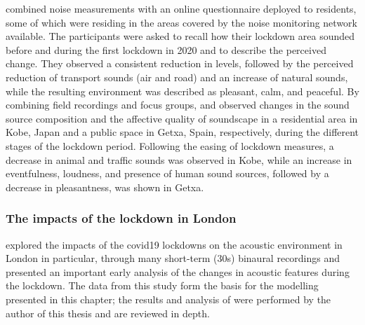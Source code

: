  \citet{Munoz2020Lockdown} combined noise measurements with an online questionnaire deployed to residents, some of which were residing in the areas covered by the noise monitoring network available. The participants were asked to recall how their lockdown area sounded before and during the first lockdown in 2020 and to describe the perceived change. They observed a consistent reduction in levels, followed by the perceived reduction of transport sounds (air and road) and an increase of natural sounds, while the resulting environment was described as pleasant, calm, and peaceful. By combining field recordings and focus groups, \citet{Sakagami2020How} and \citet{Lenzi2021Soundscape} observed changes in the sound source composition and the affective quality of soundscape in a residential area in Kobe, Japan and a public space in Getxa, Spain, respectively, during the different stages of the lockdown period. Following the easing of lockdown measures, a decrease in animal and traffic sounds was observed in Kobe, while an increase in eventfulness, loudness, and presence of human sound sources, followed by a decrease in pleasantness, was shown in Getxa.

 \subsubsection{The impacts of the lockdown in London}
 \citet{Aletta2020Assessing} explored the impacts of the \gls{covid19} lockdowns on the acoustic environment in London in particular, through many short-term (30s) binaural recordings and presented an important early analysis of the changes in acoustic features during the lockdown. The data from this study form the basis for the modelling presented in this chapter; the results and analysis of \citep{Aletta2020Assessing} were performed by the author of this thesis and are reviewed in depth. 

